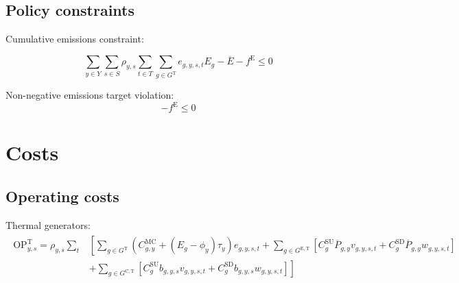 \documentclass{article}
\newcommand{\sGeneratorsExistingThermal}{G^{\mathrm{E,T}}}
\newcommand{\sGeneratorsCandidate}{G^{\mathrm{C}}}
\newcommand{\sGeneratorsCandidateThermal}{G^{\mathrm{C,T}}}
\newcommand{\sGeneratorsThermal}{G^{\mathrm{T}}}
\newcommand{\sYears}{Y}
\newcommand{\sScenarios}{S}
\newcommand{\sIntervals}{T}
\newcommand{\iGenerator}{g}
\newcommand{\iYear}{y}
\newcommand{\iScenario}{s}
\newcommand{\iInterval}{t}
\newcommand{\cOperatingCostThermal}[1][\iYear,\iScenario]{\mathrm{OP}^{\mathrm{T}}_{#1}}
\newcommand{\cScenarioDuration}[1][\iYear,\iScenario]{\rho_{#1}}
\newcommand{\cMarginalCost}[1][\iGenerator,\iYear]{C^{\mathrm{MC}}_{#1}}
\newcommand{\cStartupCost}[1][\iGenerator]{C^{\mathrm{SU}}_{#1}}
\newcommand{\cShutdownCost}[1][\iGenerator]{C^{\mathrm{SD}}_{#1}}
\newcommand{\cEmissionsIntensity}[1][\iGenerator]{E_{#1}}
\newcommand{\cPowerOutputMax}[1][\iGenerator,\iYear]{\overline{P}_{#1}}
\newcommand{\cEmmissionsCumulativeTarget}{\overline{E}}
\newcommand{\cSchemeRevenueCumulativeTarget}{\overline{R}}
\newcommand{\vBaseline}[1][\iYear]{\phi_{#1}}
\newcommand{\vPermitPrice}[1][\iYear]{\tau_{#1}}
\newcommand{\vEnergy}[1][\iGenerator,\iYear,\iScenario,\iInterval]{e_{#1}}
\newcommand{\vStartupIndicator}[1][\iGenerator,\iYear,\iScenario,\iInterval]{v_{#1}}
\newcommand{\vShutdownIndicator}[1][\iGenerator,\iYear,\iScenario,\iInterval]{w_{#1}}
\newcommand{\vEmissionsTargetViolation}{f^{\mathrm{E}}}
\newcommand{\vInstalledCapacityTotalScenario}[1][\iGenerator,\iYear,\iScenario]{b_{#1}}
\begin{document}
\subsection{Policy constraints}

Cumulative emissions constraint:

\begin{equation}
\sum\limits_{\iYear \in \sYears} \sum\limits_{\iScenario \in \sScenarios} \cScenarioDuration \sum\limits_{\iInterval \in \sIntervals} \sum\limits_{\iGenerator \in \sGeneratorsThermal} \vEnergy \cEmissionsIntensity - \cEmmissionsCumulativeTarget - \vEmissionsTargetViolation \leq 0
\label{eqn: cumulative emissions target}
\end{equation}

Non-negative emissions target violation:
\begin{equation}
	-\vEmissionsTargetViolation \leq 0
	\label{eqn: non negative emissions target violation}
\end{equation}

%

\section{Costs}
\subsection{Operating costs}
Thermal generators:
\begin{align}
	\begin{split}
		\cOperatingCostThermal = \cScenarioDuration\sum\limits_{\iInterval} & \left[\sum\limits_{\iGenerator \in \sGeneratorsThermal} (\cMarginalCost + (\cEmissionsIntensity - \vBaseline)\vPermitPrice)\vEnergy + \sum\limits_{\iGenerator \in \sGeneratorsExistingThermal} \left[\cStartupCost \cPowerOutputMax \vStartupIndicator + \cShutdownCost \cPowerOutputMax \vShutdownIndicator\right] \right.\\
		& \left. + \sum\limits_{\iGenerator \in \sGeneratorsCandidateThermal} \left[\cStartupCost \vInstalledCapacityTotalScenario \vStartupIndicator + \cShutdownCost \vInstalledCapacityTotalScenario \vShutdownIndicator\right] \right]\\
	\end{split}
	\label{eqn: total thermal generator operating cost}
\end{align}
\end{document}
